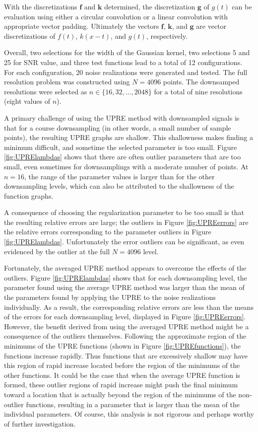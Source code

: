 \documentclass[12pt,notitlepage]{report}
\newcommand{\gVec}{\mathbf{g}}	%
\newcommand{\kVec}{\mathbf{k}}	%
\newcommand{\fVec}{\mathbf{f}}	%
\begin{document}
With the discretizations $\fVec$ and $\kVec$ determined, the discretization $\gVec$ of $g(t)$ can be evaluation using either a circular convolution or a linear convolution with appropriate vector padding. Ultimately the vectors $\fVec$, $\kVec$, and $\gVec$ are vector discretizations of $f(t)$, $k(x-t)$, and $g(t)$, respectively. \par
Overall, two selections for the width of the Gaussian kernel, two selections 5 and 25 for SNR value, and three test functions lead to a total of 12 configurations. For each configuration, 20 noise realizations were generated and tested. The full resolution problem was constructed using $N = 4096$ points. The downsamped resolutions were selected as $n \in \{16,32,\ldots,2048\}$ for a total of nine resolutions (eight values of $n$). \par 
A primary challenge of using the UPRE method with downsampled signals is that for a course downsampling (in other words, a small number of sample points), the resulting UPRE graphs are shallow. This shallowness makes finding a minimum difficult, and sometime the selected parameter is too small. Figure \ref{fig:UPRElambdas} shows that there are often outlier parameters that are too small, even sometimes for downsamplings with a moderate number of points. At $n = 16$, the range of the parameter values is larger than for the other downsampling levels, which can also be attributed to the shallowness of the function graphs. \par 
A consequence of choosing the regularization parameter to be too small is that the resulting relative errors are large; the outliers in Figure \ref{fig:UPREerrors} are the relative errors corresponding to the parameter outliers in Figure \ref{fig:UPRElambdas}. Unfortunately the error outliers can be significant, as even evidenced by the outlier at the full $N = 4096$ level. \par 
Fortunately, the averaged UPRE method appears to overcome the effects of the outliers. Figure \ref{fig:UPRElambdas} shows that for each downsampling level, the parameter found using the average UPRE method was larger than the mean of the parameters found by applying the UPRE to the noise realizations individually. As a result, the corresponding relative errors are less than the means of the errors for each downsampling level, displayed in Figure \ref{fig:UPREerrors}. However, the benefit derived from using the averaged UPRE method might be a consequence of the outliers themselves. Following the approximate region of the minimums of the UPRE functions (shown in Figure \ref{fig:UPREfunctions}), the functions increase rapidly. Thus functions that are excessively shallow may have this region of rapid increase located before the region of the minimums of the other functions. It could be the case that when the average UPRE function is formed, these outlier regions of rapid increase might push the final minimum toward a location that is actually beyond the region of the minimums of the non-outlier functions, resulting in a parameter that is larger than the mean of the individual parameters. Of course, this analysis is not rigorous and perhaps worthy of further investigation. 
\end{document}
